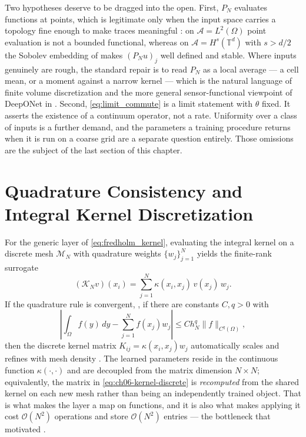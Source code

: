 Two hypotheses deserve to be dragged into the open. First, $P_N$ evaluates
functions at points, which is legitimate only when the input space carries a
topology fine enough to make traces meaningful
\cite{evans2010partial}: on $\mathcal{A}=L^2(\Omega)$ point evaluation is not a
bounded functional, whereas on $\mathcal{A}=H^s(\mathbb{T}^d)$ with $s>d/2$ the
Sobolev embedding of
 makes $(P_N u)_j$
well defined and stable.
Where inputs genuinely are rough, the standard repair is to read $P_N$ as a local
average --- a cell mean, or a moment against a narrow kernel --- which is the
natural language of finite volume discretization
and the more general sensor-functional viewpoint of DeepONet in
. Second,
\eqref{eq:limit_commute} is a limit statement with $\theta$ fixed. It asserts the
existence of a continuum operator, not a rate. Uniformity over a class of
inputs is a further demand, and the parameters a training procedure returns
when it is run on a coarse grid are a separate question entirely. Those omissions are the subject of the
last section of this chapter.

\section{Quadrature Consistency and Integral Kernel Discretization}
\label{sec:ch06-quadrature}

For the generic layer of \eqref{eq:fredholm_kernel}, evaluating the integral
kernel on a discrete mesh $\mathcal{M}_N$ with quadrature weights
$\{w_j\}_{j=1}^N$ yields the finite-rank surrogate
\begin{equation}
  \label{eq:ch06-kernel-discrete}
  (\mathcal{K}_N v)(x_i) = \sum_{j=1}^N \kappa(x_i, x_j) \, v(x_j) \, w_j .
\end{equation}
If the quadrature rule is convergent, \ie, if there are constants $C,q>0$ with
\begin{equation}
  \label{eq:ch06-quadrature}
  \left| \int_\Omega f(y) \, dy - \sum_{j=1}^N f(x_j) w_j \right| \le C h_N^q \|f\|_{C^q(\Omega)},
\end{equation}
then the discrete kernel matrix $K_{ij} = \kappa(x_i, x_j) w_j$ automatically
scales and refines with mesh density \cite{kovachki2023neural}. The learned
parameters reside in the continuous function $\kappa(\cdot,\cdot)$ and are
decoupled from the matrix dimension $N\times N$; equivalently, the matrix in
\eqref{eq:ch06-kernel-discrete} is \emph{recomputed} from the shared kernel on
each new mesh rather than being an independently trained object. That is what
makes the layer a map on functions, and it is also what makes applying it cost
$\mathcal{O}(N^2)$ operations and store $\mathcal{O}(N^2)$ entries --- the
bottleneck that motivated
.

